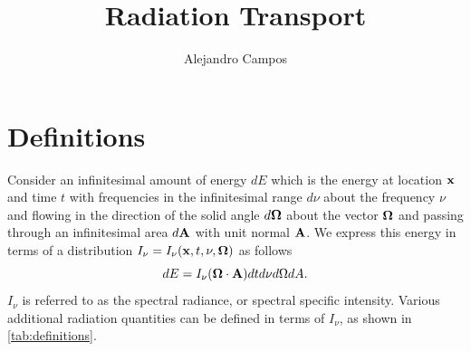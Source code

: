 \documentclass[a4paper,11pt]{article}
\title{Radiation Transport}
\author{Alejandro Campos}
\begin{document}
\maketitle
\tableofcontents

\section{Definitions}
Consider an infinitesimal amount of energy $dE$ which is the energy at location $\mathbf{x}$ and time $t$ with frequencies in the infinitesimal range $d\nu$ about the frequency $\nu$ and flowing in the direction of the solid angle $d\bm \Omega$ about the vector $\bm \Omega$ and passing through an infinitesimal area $d\mathbf{A}$ with unit normal $\mathbf{A}$. We express this energy in terms of a distribution $I_\nu = I_\nu(\mathbf{x}, t, \nu, \bm \Omega)$ as follows
\begin{equation}
    dE = I_\nu (\bm \Omega \cdot \mathbf{A}) dt d\nu d\Omega dA.
\end{equation}
$I_\nu$ is referred to as the spectral radiance, or spectral specific intensity. Various additional radiation quantities can be defined in terms of $I_\nu$, as shown in \cref{tab:definitions}.

\setlength{\cellspacetoplimit}{3pt}
\setlength{\cellspacebottomlimit}{3pt}
\end{document}
